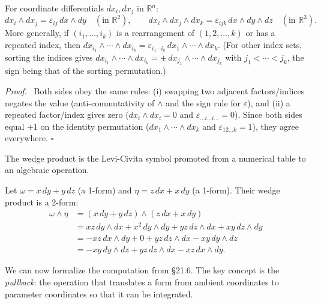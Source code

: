 \documentclass[11pt]{report}
\renewenvironment{proof}[1][Proof]{\par\noindent\textit{#1.}\ }{\hfill$\square$\par\medskip}
\newcommand{\R}{\mathbb{R}}
\begin{document}
\begin{proposition}
For coordinate differentials $dx_i, dx_j$ in $\R^n$:
\[
dx_i \wedge dx_j = \varepsilon_{ij}\,dx \wedge dy \quad (\text{in } \R^2), \qquad dx_i \wedge dx_j \wedge dx_k = \varepsilon_{ijk}\,dx \wedge dy \wedge dz \quad (\text{in } \R^3).
\]
More generally, if $(i_1, \ldots, i_k)$ is a rearrangement of $(1, 2, \ldots, k)$ or has a repeated index, then $dx_{i_1} \wedge \cdots \wedge dx_{i_k} = \varepsilon_{i_1 \cdots i_k}\,dx_1 \wedge \cdots \wedge dx_k$. (For other index sets, sorting the indices gives $dx_{i_1} \wedge \cdots \wedge dx_{i_k} = \pm\, dx_{j_1} \wedge \cdots \wedge dx_{j_k}$ with $j_1 < \cdots < j_k$, the sign being that of the sorting permutation.)
\end{proposition}

\begin{proof}
Both sides obey the same rules: (i) swapping two adjacent factors/indices negates the value (anti-commutativity of $\wedge$ and the sign rule for $\varepsilon$), and (ii) a repeated factor/index gives zero ($dx_i \wedge dx_i = 0$ and $\varepsilon_{\ldots i \ldots i \ldots} = 0$). Since both sides equal $+1$ on the identity permutation ($dx_1 \wedge \cdots \wedge dx_k$ and $\varepsilon_{12\ldots k} = 1$), they agree everywhere.
\end{proof}

The wedge product is the Levi-Civita symbol promoted from a numerical table to an algebraic operation.

\begin{example}
Let $\omega = x \, dy + y \, dz$ (a 1-form) and $\eta = z \, dx + x \, dy$ (a 1-form). Their wedge product is a 2-form:
\begin{align*}
\omega \wedge \eta &= (x \, dy + y \, dz) \wedge (z \, dx + x \, dy) \\
&= xz \, dy \wedge dx + x^2 \, dy \wedge dy + yz \, dz \wedge dx + xy \, dz \wedge dy \\
&= -xz \, dx \wedge dy + 0 + yz \, dz \wedge dx - xy \, dy \wedge dz \\
&= -xy \, dy \wedge dz + yz \, dz \wedge dx - xz \, dx \wedge dy.
\end{align*}
\end{example}

We can now formalize the computation from \S21.6. The key concept is the \textit{pullback}: the operation that translates a form from ambient coordinates to parameter coordinates so that it can be integrated.
\end{document}
